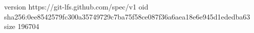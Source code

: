 version https://git-lfs.github.com/spec/v1
oid sha256:0ee8542579fc300a35749729c7ba75f58ce087f36a6aea18e6e945d1ededba63
size 196704
